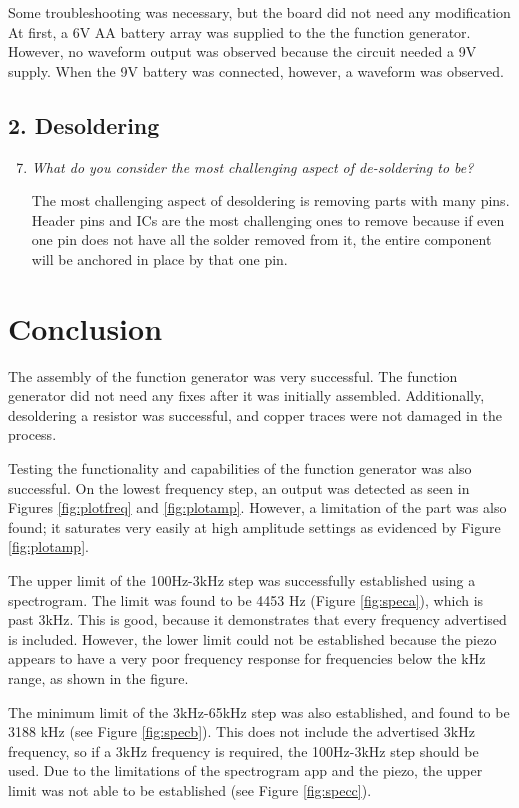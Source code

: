 \documentclass[12pt]{article}
\begin{document}
\begin{enumerate}
{        Some troubleshooting was necessary, but the board did not need any modification At first, a 6V AA battery
        array was supplied to the the function generator. However, no waveform output was observed because 
        the circuit needed a 9V supply. When the 9V battery was connected, however, a waveform was observed.
    }   
\end{enumerate}

\subsection*{2. Desoldering}
\begin{enumerate}
    \setcounter{enumi}{6} 
    \item {
        \textit{What do you consider the most challenging aspect of de-soldering to be?}

        The most challenging aspect of desoldering is removing parts with many pins. Header pins and ICs 
        are the most challenging ones to remove because if even one pin does not have all the solder removed 
        from it, the entire component will be anchored in place by that one pin.
    } 
\end{enumerate}


\section*{Conclusion}

The assembly of the function generator was very successful. The function generator did not need any 
fixes after it was initially assembled. Additionally, desoldering a resistor was successful, and copper 
traces were not damaged in the process.

Testing the functionality and capabilities of the function generator was also successful. On the lowest frequency step, an output was 
detected as seen in Figures \ref{fig:plotfreq} and \ref{fig:plotamp}. However, a limitation of the part
was also found; it saturates very easily at high amplitude settings as evidenced by Figure \ref{fig:plotamp}.

The upper limit of the 100Hz-3kHz step was successfully established using a spectrogram.
The limit was found to be 4453 Hz (Figure \ref{fig:speca}), which is past 3kHz. This is good, because it demonstrates that every frequency advertised 
is included. However, the lower limit could not be established because the piezo 
appears to have a very poor frequency response for frequencies below the kHz range, as shown in the figure.

The minimum limit of the 3kHz-65kHz step was also established, and found to be 3188 kHz (see Figure \ref{fig:specb}).
This does not include the advertised 3kHz frequency, so if a 3kHz frequency is required, the 100Hz-3kHz step 
should be used. Due to the limitations of the spectrogram app and the piezo, the upper limit was not able to be established (see Figure \ref{fig:specc}).
\end{document}
